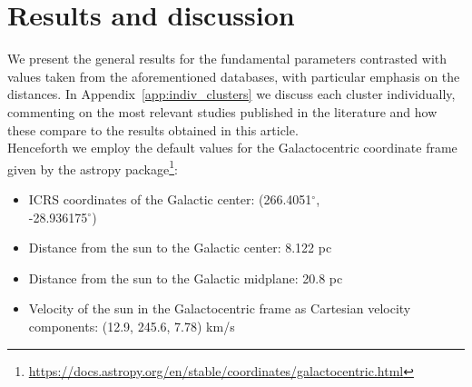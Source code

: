 \documentclass[draft]{aa}
\begin{document}
\section{Results and discussion}
 \label{sec:results}

 We present the general results for the
 fundamental parameters contrasted with values taken from the
 aforementioned databases, with particular emphasis on the distances.
 In Appendix~\ref{app:indiv_clusters} we discuss each cluster
 individually, commenting on the most relevant studies published in the
 literature and how these compare to the results obtained in this article.\\

 Henceforth we employ the default values for the Galactocentric coordinate
 frame given by the astropy
 package\footnote{\url{https://docs.astropy.org/en/stable/coordinates/galactocentric.html}}:

 \begin{itemize}
  \item ICRS coordinates of the Galactic center: (266.4051$^{\circ}$,\\
  -28.936175$^{\circ}$)
  \item Distance from the sun to the Galactic center: 8.122 pc
  \item Distance from the sun to the Galactic midplane: 20.8 pc
  \item Velocity of the sun in the Galactocentric frame as Cartesian velocity
  components: (12.9, 245.6, 7.78) km/s
 \end{itemize}
\end{document}
